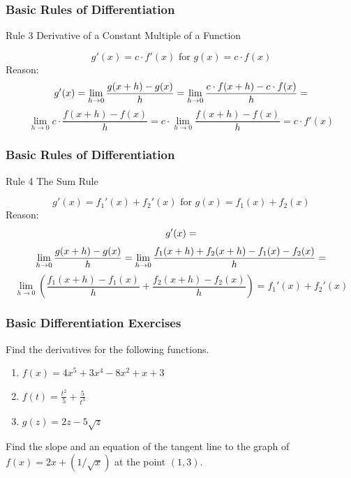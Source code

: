 \documentclass[xcolor=dvipsnames]{beamer}
\begin{document}
\begin{frame}
  \frametitle{Basic Rules of Differentiation}
  \begin{block}{Rule 3}
Derivative of a Constant Multiple of a Function
  \end{block}
\begin{equation}
  \label{eq:thahchae}
g'(x)=c\cdot{}f'(x)\mbox{ for }g(x)=c\cdot{}f(x)
\end{equation}
Reason:
\begin{equation}
  \label{eq:quaipahn}
g'(x)=\lim_{h\rightarrow{}0}\frac{g(x+h)-g(x)}{h}=\lim_{h\rightarrow{}0}\frac{c\cdot{}f(x+h)-c\cdot{}f(x)}{h}=\notag
\end{equation}
\begin{equation}
  \label{eq:mitahrei}
\lim_{h\rightarrow{}0}c\cdot{}\frac{f(x+h)-f(x)}{h}=c\cdot\lim_{h\rightarrow{}0}\frac{f(x+h)-f(x)}{h}=c\cdot{}f'(x)
\end{equation}
\end{frame}

\begin{frame}
  \frametitle{Basic Rules of Differentiation}
  \begin{block}{Rule 4}
The Sum Rule
  \end{block}
\begin{equation}
  \label{eq:oubajaez}
g'(x)=f_{1}'(x)+f_{2}'(x)\mbox{ for }g(x)=f_{1}(x)+f_{2}(x)
\end{equation}
Reason:
\begin{equation}
  \label{eq:heyanaci}
g'(x)=\notag
\end{equation}
\begin{equation}
  \label{eq:bahgosio}
\lim_{h\rightarrow{}0}\frac{g(x+h)-g(x)}{h}=\lim_{h\rightarrow{}0}\frac{f_{1}(x+h)+f_{2}(x+h)-f_{1}(x)-f_{2}(x)}{h}=\notag
\end{equation}
\begin{equation}
  \label{eq:eceishie}
\lim_{h\rightarrow{}0}\left(\frac{f_{1}(x+h)-f_{1}(x)}{h}+\frac{f_{2}(x+h)-f_{2}(x)}{h}\right)=f_{1}'(x)+f_{2}'(x)
\end{equation}
\end{frame}

\begin{frame}
  \frametitle{Basic Differentiation Exercises}
{\ubung} Find the derivatives for the following functions.
\begin{enumerate}
\item $f(x)=4x^{5}+3x^{4}-8x^{2}+x+3$
\item $f(t)=\frac{t^{2}}{5}+\frac{5}{t^{3}}$
\item $g(z)=2z-5\sqrt{z}$
\end{enumerate}

\bigskip

{\ubung} Find the slope and an equation of the tangent line to the graph of
$f(x)=2x+(1/\sqrt{x})$ at the point $(1,3)$.
\end{frame}
\end{document}
